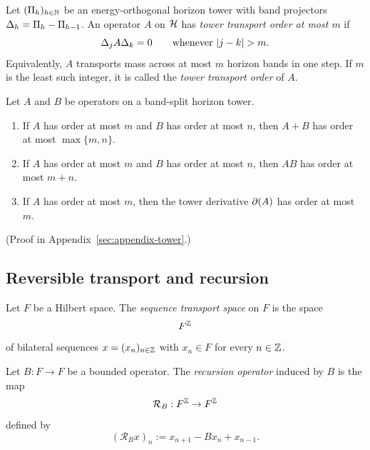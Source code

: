 \begin{definition}
\label{def:tower-transport-order}
Let $(\Pi_{h})_{h\in\mathbb{N}}$ be an energy-orthogonal horizon tower with band
projectors $\Delta_{h}=\Pi_{h}-\Pi_{h-1}$. An operator $A$ on $\mathcal{H}$ has
\emph{tower transport order at most $m$} if
\[
\CCDelta{j}A\CCDelta{k}=0
\qquad\text{whenever }|j-k|>m.
\]
Equivalently, $A$ transports mass across at most $m$ horizon bands in one step.
If $m$ is the least such integer, it is called the \emph{tower transport order}
of $A$.
\end{definition}

\begin{proposition}
\label{prop:tower-order-arithmetic}
Let $A$ and $B$ be operators on a band-split horizon tower.
\begin{enumerate}[label=(\roman*), leftmargin=2em, itemsep=0.2em]
\item If $A$ has order at most $m$ and $B$ has order at most $n$, then
      $A+B$ has order at most $\max\{m,n\}$.
\item If $A$ has order at most $m$ and $B$ has order at most $n$, then
      $AB$ has order at most $m+n$.
\item If $A$ has order at most $m$, then the tower derivative $\partial(A)$ has
      order at most $m$.
\end{enumerate}
\end{proposition}

(Proof in Appendix~\ref{sec:appendix-tower}.)

\subsection{Reversible transport and recursion}
\label{subsec:reversible-transport-recursion}

\begin{definition}
\label{def:sequence-transport-space}
Let $F$ be a Hilbert space. The \emph{sequence transport space} on $F$ is the
space
\[
F^{\mathbb{Z}}
\]
of bilateral sequences $x=(x_n)_{n\in\mathbb{Z}}$ with $x_n\in F$ for every
$n\in\mathbb{Z}$.
\end{definition}

\begin{definition}
\label{def:transport-recursion-operator}
Let $B:F\to F$ be a bounded operator. The \emph{recursion operator} induced by
$B$ is the map
\[
\mathcal R_B:F^{\mathbb{Z}}\to F^{\mathbb{Z}}
\]
defined by
\[
(\mathcal R_B x)_n := x_{n+1} - Bx_n + x_{n-1}.
\]
\end{definition}

